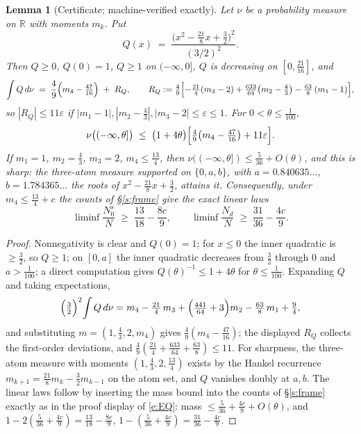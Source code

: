 \documentclass[11pt]{article}
\numberwithin{equation}{section}
\newtheorem{lemma}[theorem]{Lemma}
\theoremstyle{definition}
\theoremstyle{remark}
\begin{document}
\begin{lemma}[Certificate; machine-verified exactly]\label{l:cert}
Let $\nu$ be a probability measure on $\mathbb R$ with moments
$m_k$. Put
\[
Q(x)\;=\;\frac{\bigl(x^2-\tfrac{21}{8}x+\tfrac32\bigr)^2}{(3/2)^2}.
\]
Then $Q\ge0$, $Q(0)=1$, $Q\ge1$ on $(-\infty,0]$, $Q$ is
decreasing on $[0,\tfrac{21}{16}]$, and
\begin{equation}\label{e:EQ}
\int Q\,d\nu \;=\; \frac{4}{9}\Bigl(m_4-\tfrac{47}{16}\Bigr)
\;+\;R_Q,\qquad
R_Q:=\tfrac{4}{9}\Bigl[-\tfrac{21}{4}(m_3-2)
+\tfrac{633}{64}\bigl(m_2-\tfrac43\bigr)
-\tfrac{63}{8}\,(m_1-1)\Bigr],
\end{equation}
so $|R_Q|\le11\varepsilon$ if $|m_1-1|,|m_2-\tfrac43|,
|m_3-2|\le\varepsilon\le1$. For $0<\theta\le\tfrac1{100}$,
\[
\nu\bigl((-\infty,\theta]\bigr)
\;\le\;\bigl(1+4\theta\bigr)
\Bigl[\tfrac{4}{9}\bigl(m_4-\tfrac{47}{16}\bigr)
+11\varepsilon\Bigr].
\]
If $m_1=1$, $m_2=\tfrac43$, $m_3=2$, $m_4\le\tfrac{13}4$, then
$\nu((-\infty,\theta])\le\tfrac5{36}+O(\theta)$, and this is
sharp: the three-atom measure supported on $\{0,a,b\}$, with
$a=0.840635\ldots$, $b=1.784365\ldots$ the roots of
$x^2-\tfrac{21}8x+\tfrac32$, attains it. Consequently, under
$m_4\le\tfrac{13}4+c$ the counts of \S\ref{s:frame} give the
exact linear laws
\[
\liminf\frac{N_0^{s}}{N}\;\ge\;\frac{13}{18}-\frac{8c}{9},
\qquad
\liminf\frac{N_d}{N}\;\ge\;\frac{31}{36}-\frac{4c}{9}.
\]
\end{lemma}

\begin{proof}
Nonnegativity is clear and $Q(0)=1$; for $x\le0$ the inner
quadratic is $\ge\tfrac32$, so $Q\ge1$; on $[0,a]$ the inner
quadratic decreases from $\tfrac32$ through $0$ and $a>\tfrac1{100}$;
a direct computation gives $Q(\theta)^{-1}\le1+4\theta$ for
$\theta\le\tfrac1{100}$. Expanding $Q$ and taking expectations,
\[
\Bigl(\tfrac32\Bigr)^2\!\int Q\,d\nu
=m_4-\tfrac{21}4\,m_3+\Bigl(\tfrac{441}{64}+3\Bigr)m_2
-\tfrac{63}8\,m_1+\tfrac94,
\]
and substituting $m=(1,\tfrac43,2,m_4)$ gives
$\tfrac49(m_4-\tfrac{47}{16})$; the displayed $R_Q$ collects the
first-order deviations, and
$\tfrac49(\tfrac{21}4+\tfrac{633}{64}+\tfrac{63}8)\le11$. For
sharpness, the three-atom measure with moments
$(1,\tfrac43,2,\tfrac{13}4)$ exists by the Hankel recurrence
$m_{k+1}=\tfrac{21}8m_k-\tfrac32m_{k-1}$ on the atom set, and $Q$
vanishes doubly at $a,b$. The linear laws follow by inserting the
mass bound into the counts of \S\ref{s:frame} exactly as in the
proof display of \eqref{e:EQ}: mass
$\le\tfrac5{36}+\tfrac{4c}9+O(\theta)$, and
$1-2(\tfrac5{36}+\tfrac{4c}9)=\tfrac{13}{18}-\tfrac{8c}9$,
$1-(\tfrac5{36}+\tfrac{4c}9)=\tfrac{31}{36}-\tfrac{4c}9$.
\end{proof}
\end{document}
